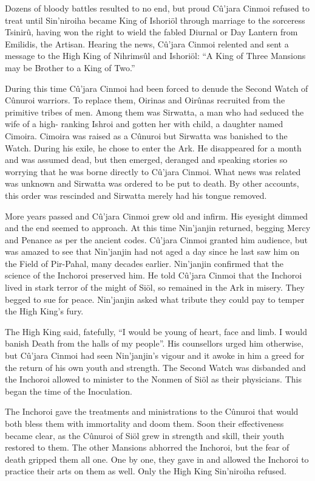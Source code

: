 \documentclass[]{book}
\begin{document}
Dozens of bloody battles resulted to no end, but proud Cû'jara Cinmoi refused to treat
until Sin'niroiha became King of Ishoriöl through marriage to the sorceress Tsinirû,
having won the right to wield the fabled Diurnal or Day Lantern from Emilidis, the
Artisan. Hearing the news, Cû'jara Cinmoi relented and sent a message to the High
King of Nihrimsûl and Ishoriöl: ``A King of Three Mansions may be Brother to a King
of Two.''

During this time Cû'jara Cinmoi had been forced to denude the Second Watch of
Cûnuroi warriors. To replace them, Oirinas and Oirûnas recruited from the primitive
tribes of men. Among them was Sirwatta, a man who had seduced the wife of a high-
ranking Ishroi and gotten her with child, a daughter named Cimoira. Cimoira was
raised as a Cûnuroi but Sirwatta was banished to the Watch. During his exile, he chose
to enter the Ark. He disappeared for a month and was assumed dead, but then
emerged, deranged and speaking stories so worrying that he was borne directly to
Cû'jara Cinmoi. What news was related was unknown and Sirwatta was ordered to be
put to death. By other accounts, this order was rescinded and Sirwatta merely had his
tongue removed.

More years passed and Cû'jara Cinmoi grew old and infirm. His eyesight dimmed and
the end seemed to approach. At this time Nin'janjin returned, begging Mercy and
Penance as per the ancient codes. Cû'jara Cinmoi granted him audience, but was
amazed to see that Nin'janjin had not aged a day since he last saw him on the Field of
Pir-Pahal, many decades earlier. Nin'janjin confirmed that the science of the Inchoroi
preserved him. He told Cû'jara Cinmoi that the Inchoroi lived in stark terror of the
might of Siöl, so remained in the Ark in misery. They begged to sue for peace.
Nin'janjin asked what tribute they could pay to temper the High King's fury.

The High King said, fatefully, ``I would be young of heart, face and limb. I would banish
Death from the halls of my people''. His counsellors urged him otherwise, but Cû'jara
Cinmoi had seen Nin'janjin's vigour and it awoke in him a greed for the return of his
own youth and strength. The Second Watch was disbanded and the Inchoroi allowed
to minister to the Nonmen of Siöl as their physicians. This began the time of the
Inoculation.

The Inchoroi gave the treatments and ministrations to the Cûnuroi that would both
bless them with immortality and doom them. Soon their effectiveness became clear, as
the Cûnuroi of Siöl grew in strength and skill, their youth restored to them. The other
Mansions abhorred the Inchoroi, but the fear of death gripped them all one. One by one, they gave in and allowed the Inchoroi to practice their arts on them as well. Only
the High King Sin'niroiha refused.
\end{document}
